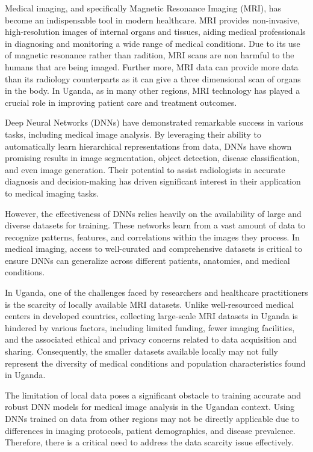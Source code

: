 Medical imaging, and specifically Magnetic Resonance Imaging (MRI), has become an indispensable tool in modern healthcare. MRI provides non-invasive, high-resolution images of internal organs and tissues, aiding medical professionals in diagnosing and monitoring a wide range of medical conditions. Due to its use of magnetic resonance rather than radition, MRI scans are non harmful to the humans that are being imaged. Further more, MRI data can provide more data than its radiology counterparts as it can give a three dimensional scan of organs in the body. In Uganda, as in many other regions, MRI technology has played a crucial role in improving patient care and treatment outcomes.

Deep Neural Networks (DNNs) have demonstrated remarkable success in various tasks, including medical image analysis\cite{mani2020model}. By leveraging their ability to automatically learn hierarchical representations from data, DNNs have shown promising results in image segmentation, object detection, disease classification, and even image generation. Their potential to assist radiologists in accurate diagnosis and decision-making has driven significant interest in their application to medical imaging tasks.

However, the effectiveness of DNNs relies heavily on the availability of large and diverse datasets for training. These networks learn from a vast amount of data to recognize patterns, features, and correlations within the images they process. In medical imaging, access to well-curated and comprehensive datasets is critical to ensure DNNs can generalize across different patients, anatomies, and medical conditions.

In Uganda, one of the challenges faced by researchers and healthcare practitioners is the scarcity of locally available MRI datasets. Unlike well-resourced medical centers in developed countries, collecting large-scale MRI datasets in Uganda is hindered by various factors, including limited funding, fewer imaging facilities, and the associated ethical and privacy concerns related to data acquisition and sharing. Consequently, the smaller datasets available locally may not fully represent the diversity of medical conditions and population characteristics found in Uganda.

The limitation of local data poses a significant obstacle to training accurate and robust DNN models for medical image analysis in the Ugandan context. Using DNNs trained on data from other regions may not be directly applicable due to differences in imaging protocols, patient demographics, and disease prevalence. Therefore, there is a critical need to address the data scarcity issue effectively.

